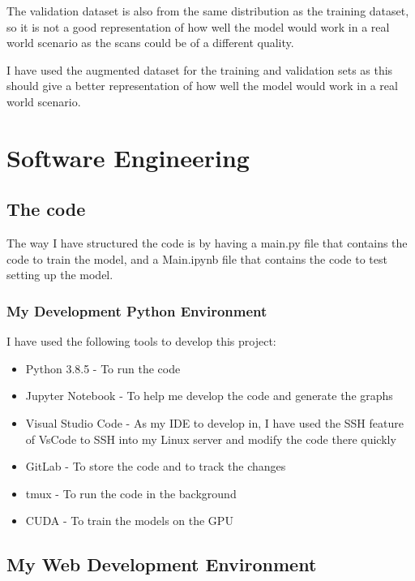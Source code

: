 \documentclass[]{final_report}
\begin{document}
The validation dataset is also from the same distribution as the training dataset,
so it is not a good representation of how well the model would work in a real world scenario
as the scans could be of a different quality.

I have used the augmented dataset for the training and validation sets as this
should give a better representation of how well the model would work in a real world scenario.




\pagebreak

\chapter{Software Engineering}
\section{The code}
The way I have structured the code is by having a main.py file that contains the code to train the model, and a Main.ipynb file that contains the code to test setting up the model.

\subsection{My Development Python Environment}
I have used the following tools to develop this project:
\begin{itemize}
  \item Python 3.8.5\cite{Python} - To run the code
  \item Jupyter Notebook\cite{Jupyter} - To help me develop the code and generate the graphs
  \item Visual Studio Code\cite{VsCode} - As my IDE to develop in, I have used the SSH feature of VsCode to SSH into my Linux server and modify the code there quickly
  \item GitLab\cite{RHULGitLab} - To store the code and to track the changes
  \item tmux\cite{tmux} - To run the code in the background
  \item CUDA\cite{CUDA} - To train the models on the GPU
\end{itemize}

\section{My Web Development Environment}
\end{document}
